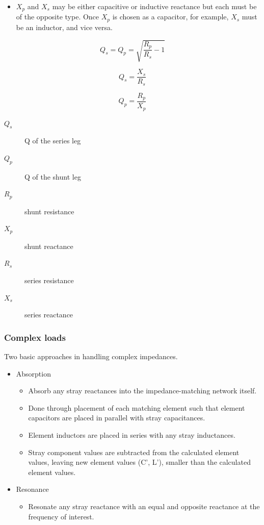 \begin{itemize}
	\item $X_p$ and $X_s$ may be either capacitive or inductive reactance but each must be of the opposite type. Once $X_p$ is chosen as a capacitor, for example, $X_s$ must be an inductor, and vice versa.
\end{itemize}

\begin{equation}
Q_s = Q_p = \sqrt{\dfrac{R_p}{R_s}-1}
\end{equation}

\begin{equation}
Q_s = \dfrac{X_s}{R_s}
\end{equation}

\begin{equation}
Q_p = \dfrac{R_p}{X_p}
\end{equation}

\begin{description}
	\item[$Q_s$] Q of the series leg
	\item[$Q_p$] Q of the shunt leg
	\item[$R_p$] shunt resistance
	\item[$X_p$] shunt reactance
	\item[$R_s$] series resistance
	\item[$X_s$] series reactance
\end{description}

\subsubsection{Complex loads}
Two basic approaches in handling complex impedances.
\begin{itemize}
	\item Absorption
	\begin{itemize}
		\item Absorb any stray reactances into the impedance-matching network itself.
		\item Done through placement of each matching element such that element capacitors are placed in parallel with stray capacitances.
		\item Element inductors are placed in series with any stray inductances. 
		\item Stray component values are subtracted from the calculated element
		values, leaving new element values (C', L'), smaller than the calculated element values.
	\end{itemize}
	\item Resonance
	\begin{itemize}
		\item Resonate any stray reactance with an	equal and opposite reactance at the frequency of interest.
	\end{itemize}
\end{itemize}

